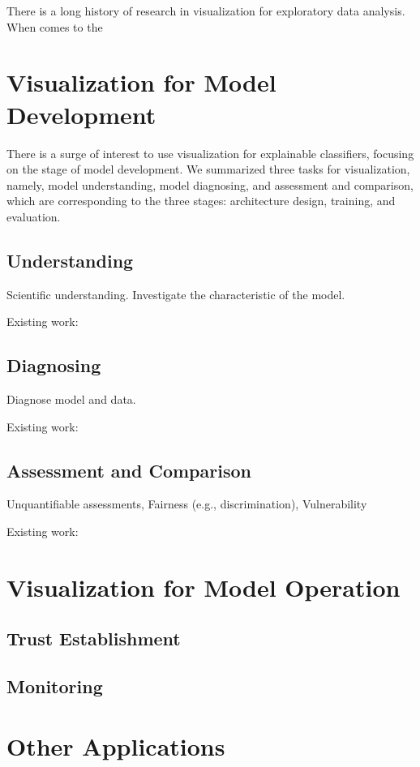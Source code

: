 There is a long history of research in visualization for exploratory data analysis. When comes to the 


\section{Visualization for Model Development}

There is a surge of interest to use visualization for explainable classifiers, focusing on the stage of model development. We summarized three tasks for visualization, namely, model understanding, model diagnosing, and assessment and comparison, which are corresponding to the three stages: architecture design, training, and evaluation.

\subsection{Understanding}

Scientific understanding. Investigate the characteristic of the model.

Existing work:

\subsection{Diagnosing}

Diagnose model and data.

Existing work: 

\subsection{Assessment and Comparison}

Unquantifiable assessments, Fairness (e.g., discrimination), Vulnerability

Existing work: 

\section{Visualization for Model Operation}
\subsection{Trust Establishment}
\subsection{Monitoring}

\section{Other Applications}
